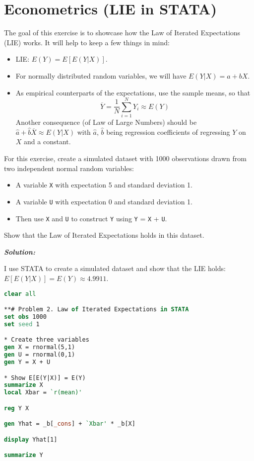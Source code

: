 \documentclass[12pt, letterpaper]{article}
\begin{document}
\section{Econometrics (LIE in STATA)}
The goal of this exercise is to showcase how the Law of Iterated Expectations (LIE) works. It will help to keep a few things in mind:
\begin{itemize}
    \item LIE: $E(Y) = E[E(Y|X)]$.
    \item For normally distributed random variables, we will have $E(Y|X) = a + bX$.
    \item As empirical counterparts of the expectations, use the sample means, so that
    \begin{equation*}
        \overline{Y} = \frac{1}{N} \sum_{i=1}^N Y_i \approx E(Y)
    \end{equation*}
    Another consequence (of Law of Large Numbers) should be $\hat{a} + \hat{b} \overline{X} \approx E(Y|X)$ with $\hat{a}$, $\hat{b}$ being regression coefficients of regressing $Y$ on $X$ and a constant.
\end{itemize}
For this exercise, create a simulated dataset with 1000 observations drawn from two independent normal random variables:
\begin{itemize}
    \item A variable \lstinline{X} with expectation 5 and standard deviation 1.
    \item A variable \lstinline{U} with expectation 0 and standard deviation 1.
    \item Then use \lstinline{X} and \lstinline{U} to construct \lstinline{Y} using \lstinline{Y} = \lstinline{X} + \lstinline{U}.
\end{itemize}
Show that the Law of Iterated Expectations holds in this dataset.

\begin{shaded}
\noindent\textbf{\textit{Solution:}}\par
I use STATA to create a simulated dataset and show that the LIE holds: $E[E(Y|X)] = E(Y) \approx 4.9911$.
\begin{lstlisting}[language=Stata]
clear all

**# Problem 2. Law of Iterated Expectations in STATA
set obs 1000
set seed 1

* Create three variables
gen X = rnormal(5,1)
gen U = rnormal(0,1)
gen Y = X + U

* Show E[E(Y|X)] = E(Y)
summarize X
local Xbar = `r(mean)'

reg Y X

gen Yhat = _b[_cons] + `Xbar' * _b[X]

display Yhat[1]

summarize Y
\end{lstlisting}
\end{shaded}
\end{document}
